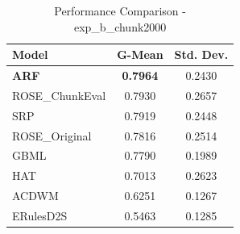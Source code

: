 \begin{table}[htbp]
\centering
\caption{Performance Comparison - exp_b_chunk2000}
\label{tab:performance_exp_b_chunk2000}
\begin{tabular}{lcc}
\toprule
Model & G-Mean & Std. Dev. \\
\midrule
\textbf{ARF} & \textbf{0.7964} & 0.2430 \\
ROSE_ChunkEval & 0.7930 & 0.2657 \\
SRP & 0.7919 & 0.2448 \\
ROSE_Original & 0.7816 & 0.2514 \\
GBML & 0.7790 & 0.1989 \\
HAT & 0.7013 & 0.2623 \\
ACDWM & 0.6251 & 0.1267 \\
ERulesD2S & 0.5463 & 0.1285 \\
\bottomrule
\end{tabular}
\end{table}